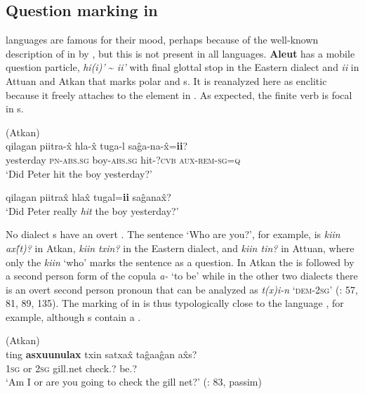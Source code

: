 \subsection{Question marking in }\label{sec:5.4.2}

 languages are famous for their  mood, perhaps because of the well-known description of  in  by \citet{Sadock1984}, but this is not present in all  languages. \textbf{Aleut} has a mobile question particle, \textit{hi(i)’} {\textasciitilde} \textit{ii’} with final glottal stop in the Eastern dialect and \textit{ii} in Attuan and Atkan \citep[82]{Bergsland1997} that marks polar and s. It is reanalyzed here as enclitic because it freely attaches to the element in . As expected, the finite verb is focal in s.

\newpage 
\ea%
    \label{ex:eska:2}
     (Atkan)\\
    \ea
    \gll qilagan  piitra-\^{x} hla-\^{x}  tuga-l sa\^{g}a-na-\^{x}=\textbf{ii}?\\
    yesterday  \textsc{pn-abs.sg}  boy-\textsc{abs.sg}  hit-?\textsc{cvb} \textsc{aux}-\textsc{rem}-\textsc{sg}=\textsc{q}\\
    \glt ‘Did Peter hit the boy yesterday?’
    
    \ex
      qilagan  piitra\^{x} hla\^{x} tugal=\textbf{{ii}} sa\^{g}ana\^{x}?\\
    \glt ‘Did Peter really \textit{hit} the boy yesterday?’ \citep[83]{Bergsland1997}
    \z
    \z

No  dialect s have an overt . The sentence ‘Who are you?’, for example, is \textit{kiin ax\^ (}\textit{t)?} in Atkan, \textit{kiin txin?} in the Eastern dialect, and \textit{kiin tin?} in Attuan, where only the  \textit{kiin} ‘who’ marks the sentence as a question. In Atkan the  is followed by a second person form of the copula \textit{a-} ‘to be’ while in the other two dialects there is an overt second person  pronoun that can be analyzed as \textit{t(x)i-n} ‘\textsc{dem}-2\textsc{sg}’ (\citealt{Bergsland1997}: 57, 81, 89, 135). The marking of  in  is thus typologically close to the  language , for example, although s contain a .

\ea%
    \label{ex:eska:3}
     (Atkan)\\
    \gll ting \textbf{{asxuunulax}} txin satxa\^{x}  ta\^{g}aa\^{g}an a\^{x}s?\\
    1\textsc{sg}  or    2\textsc{sg}  gill.net    check.?  be.?\\
    \glt ‘Am I or are you going to check the gill net?’ (\citealt{Bergsland1997}: 83, passim)
    \z

